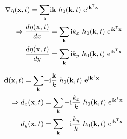\begin{align}
\nabla\eta(\mathbf{x},t) =
\sum_{\mathbf{k}}&\mathrm{i}\mathbf{k}~h_0(\mathbf{k},t)
~\mathrm{e}^{\mathrm{i}\mathbf{k}^{\mathsf{T}}\mathbf{x}} \\
\Rightarrow \frac{d\eta(\mathbf{x},t)}{dx} &=
\sum_{\mathbf{k}}\mathrm{i}k_x~h_0(\mathbf{k},t)
~\mathrm{e}^{\mathrm{i}\mathbf{k}^{\mathsf{T}}\mathbf{x}} \\
\frac{d\eta(\mathbf{x},t)}{dy} &=
\sum_{\mathbf{k}}\mathrm{i}k_y~h_0(\mathbf{k},t)
~\mathrm{e}^{\mathrm{i}\mathbf{k}^{\mathsf{T}}\mathbf{x}}
\end{align}

\begin{align}
\mathbf{d}(\mathbf{x},t) =
\sum_{\mathbf{k}}&\mathrm{-i}\frac{\mathbf{k}}{k}~h_0(\mathbf{k},t)
~\mathrm{e}^{\mathrm{i}\mathbf{k}^{\mathsf{T}}\mathbf{x}} \\
\Rightarrow d_x(\mathbf{x},t) &=
\sum_{\mathbf{k}}\mathrm{-i}\frac{k_x}{k}~h_0(\mathbf{k},t)
~\mathrm{e}^{\mathrm{i}\mathbf{k}^{\mathsf{T}}\mathbf{x}} \\
d_y(\mathbf{x},t) &=
\sum_{\mathbf{k}}\mathrm{-i}\frac{k_y}{k}~h_0(\mathbf{k},t)
~\mathrm{e}^{\mathrm{i}\mathbf{k}^{\mathsf{T}}\mathbf{x}}
\end{align}

\newcommand{\mcomplex}[2]{\ensuremath{{#1}{#2}\mathrm{i}}}


\def\SP{\hspace{5pt}}

